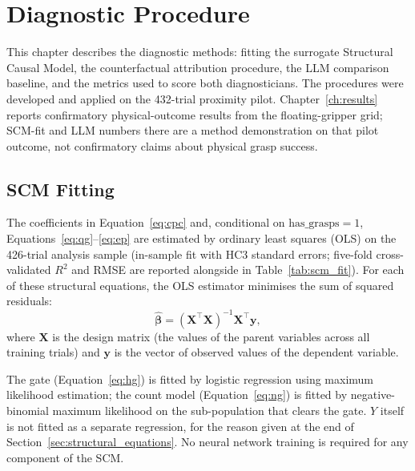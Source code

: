 \documentclass[11pt,a4paper]{report}
\begin{document}
\chapter{Diagnostic Procedure}
\label{ch:diagnosis}

This chapter describes the diagnostic methods: fitting the surrogate Structural Causal Model, the counterfactual attribution procedure, the LLM comparison baseline, and the metrics used to score both diagnosticians. The procedures were developed and applied on the 432-trial proximity pilot. Chapter~\ref{ch:results} reports confirmatory physical-outcome results from the floating-gripper grid; SCM-fit and LLM numbers there are a method demonstration on that pilot outcome, not confirmatory claims about physical grasp success.

\section{SCM Fitting}
\label{sec:scm_fitting}

The coefficients in Equation~\eqref{eq:cpc} and, conditional on $\text{has\_grasps}=1$, Equations~\eqref{eq:qg}--\eqref{eq:ep} are estimated by ordinary least squares (OLS) on the 426-trial analysis sample (in-sample fit with HC3 standard errors; five-fold cross-validated $R^2$ and RMSE are reported alongside in Table~\ref{tab:scm_fit}). For each of these structural equations, the OLS estimator minimises the sum of squared residuals:
\begin{equation}
  \hat{\boldsymbol{\beta}} = (\mathbf{X}^{\top}\mathbf{X})^{-1} \mathbf{X}^{\top} \mathbf{y},
\end{equation}
where $\mathbf{X}$ is the design matrix (the values of the parent variables across all training trials) and $\mathbf{y}$ is the vector of observed values of the dependent variable.

The gate (Equation~\ref{eq:hg}) is fitted by logistic regression using maximum likelihood estimation; the count model (Equation~\ref{eq:ng}) is fitted by negative-binomial maximum likelihood on the sub-population that clears the gate. $Y$ itself is not fitted as a separate regression, for the reason given at the end of Section~\ref{sec:structural_equations}. No neural network training is required for any component of the SCM.
\end{document}

